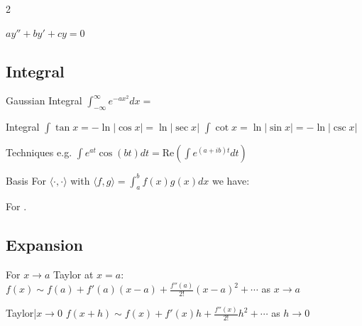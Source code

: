 \documentclass{note}
\begin{document}
\begin{multicols}{2}
{{\begin{MyTh}{$ay''+by'+cy=0$}
        \quad {}
    \end{MyTh}

    \subsection{Integral}

    \vspace{-2pt}
    \begin{MyTh}{Gaussian Integral}
        $\int^\infty_{-\infty} e^{-ax^2} dx =$  \qquad {}
    \end{MyTh}

    \begin{MyTh}{Integral}
        $\int \tan x = -\ln|\cos x| = \ln|\sec x|$ \quad $\int \cot x = \ln|\sin x|= -\ln|\csc x|$
    \end{MyTh}

    \begin{MyTh}{Techniques}
         e.g. $\int e^{at}\cos(bt)dt=\mathrm{Re}(\int e^{(a+ib)t}dt)$
    \end{MyTh}
    
    \begin{MyTh}{Basis}
        For $\langle \cdot,\cdot \rangle$ with $\langle f,g\rangle = \int_a^b f(x)g(x) dx$  we have: \quad {}

        For .
    \end{MyTh}


    \subsection{Expansion}

    \vspace{-2pt}
    \begin{MyTh}{For $x\to a$}\tiny
        Taylor at $x=a$: $f(x)\sim f(a) + f'(a)(x-a) + \frac{f''(a)}{2!}(x-a)^2 + \cdots$ as $x\to a$
    \end{MyTh}

    \vspace{-2pt}
    \begin{MyTh}{Taylor|$x\to0$}
        $f(x+h)\sim f(x) + f'(x)h + \frac{f''(x)}{2!}h^2 + \cdots$ as $h\to0$


\end{MyTh}}}
\end{multicols}
\end{document}
